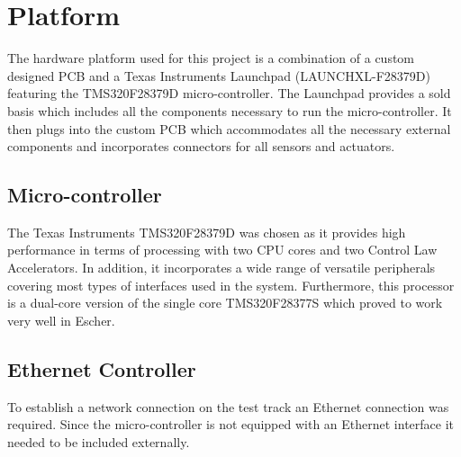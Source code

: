 

\chapter{Platform}

The hardware platform used for this project is a combination of a custom designed PCB and a Texas Instruments Launchpad (LAUNCHXL-F28379D) featuring the TMS320F28379D micro-controller. The Launchpad provides a sold basis which includes all the components necessary to run the micro-controller. It then plugs into the custom PCB which accommodates all the necessary external components and incorporates connectors for all sensors and actuators.


\section{Micro-controller}

The Texas Instruments TMS320F28379D was chosen as it provides high performance in terms of processing with two CPU cores and two Control Law Accelerators. In addition, it incorporates a wide range of versatile peripherals covering most types of interfaces used in the system. Furthermore, this processor is a dual-core version of the single core TMS320F28377S which proved to work very well in Escher.

\section{Ethernet Controller}

To establish a network connection on the test track an Ethernet connection was required. Since the micro-controller is not equipped with an Ethernet interface it needed to be included externally.

